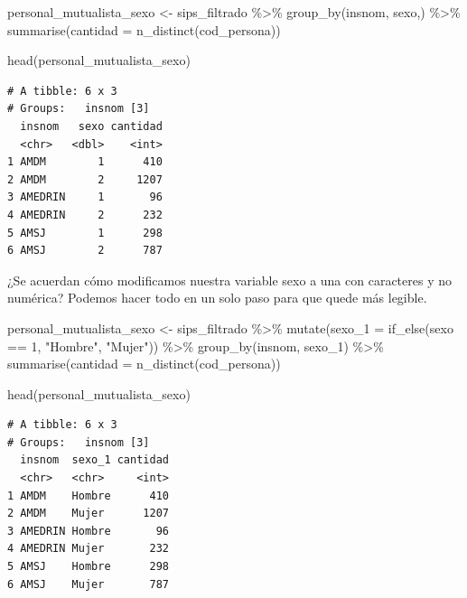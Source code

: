 \documentclass[
  letterpaper,
  DIV=11,
  numbers=noendperiod]{scrreprt}
\newenvironment{Shaded}{\begin{snugshade}}{\end{snugshade}}
\newcommand{\AttributeTok}[1]{\textcolor[rgb]{0.40,0.45,0.13}{#1}}
\newcommand{\DecValTok}[1]{\textcolor[rgb]{0.68,0.00,0.00}{#1}}
\newcommand{\FunctionTok}[1]{\textcolor[rgb]{0.28,0.35,0.67}{#1}}
\newcommand{\NormalTok}[1]{\textcolor[rgb]{0.00,0.23,0.31}{#1}}
\newcommand{\OtherTok}[1]{\textcolor[rgb]{0.00,0.23,0.31}{#1}}
\newcommand{\SpecialCharTok}[1]{\textcolor[rgb]{0.37,0.37,0.37}{#1}}
\newcommand{\StringTok}[1]{\textcolor[rgb]{0.13,0.47,0.30}{#1}}
\begin{document}
\begin{Shaded}
\begin{Highlighting}[]
\NormalTok{personal\_mutualista\_sexo }\OtherTok{\textless{}{-}}\NormalTok{ sips\_filtrado }\SpecialCharTok{\%\textgreater{}\%} 
  \FunctionTok{group\_by}\NormalTok{(insnom, sexo,) }\SpecialCharTok{\%\textgreater{}\%} 
  \FunctionTok{summarise}\NormalTok{(}\AttributeTok{cantidad =} \FunctionTok{n\_distinct}\NormalTok{(cod\_persona))}

\FunctionTok{head}\NormalTok{(personal\_mutualista\_sexo)}
\end{Highlighting}
\end{Shaded}

\begin{verbatim}
# A tibble: 6 x 3
# Groups:   insnom [3]
  insnom   sexo cantidad
  <chr>   <dbl>    <int>
1 AMDM        1      410
2 AMDM        2     1207
3 AMEDRIN     1       96
4 AMEDRIN     2      232
5 AMSJ        1      298
6 AMSJ        2      787
\end{verbatim}

¿Se acuerdan cómo modificamos nuestra variable sexo a una con caracteres
y no numérica? Podemos hacer todo en un solo paso para que quede más
legible.

\begin{Shaded}
\begin{Highlighting}[]
\NormalTok{personal\_mutualista\_sexo }\OtherTok{\textless{}{-}}\NormalTok{ sips\_filtrado }\SpecialCharTok{\%\textgreater{}\%} 
  \FunctionTok{mutate}\NormalTok{(}\AttributeTok{sexo\_1 =} \FunctionTok{if\_else}\NormalTok{(sexo }\SpecialCharTok{==} \DecValTok{1}\NormalTok{, }\StringTok{"Hombre"}\NormalTok{, }\StringTok{"Mujer"}\NormalTok{)) }\SpecialCharTok{\%\textgreater{}\%} 
  \FunctionTok{group\_by}\NormalTok{(insnom, sexo\_1) }\SpecialCharTok{\%\textgreater{}\%} 
  \FunctionTok{summarise}\NormalTok{(}\AttributeTok{cantidad =} \FunctionTok{n\_distinct}\NormalTok{(cod\_persona))}

\FunctionTok{head}\NormalTok{(personal\_mutualista\_sexo)}
\end{Highlighting}
\end{Shaded}

\begin{verbatim}
# A tibble: 6 x 3
# Groups:   insnom [3]
  insnom  sexo_1 cantidad
  <chr>   <chr>     <int>
1 AMDM    Hombre      410
2 AMDM    Mujer      1207
3 AMEDRIN Hombre       96
4 AMEDRIN Mujer       232
5 AMSJ    Hombre      298
6 AMSJ    Mujer       787
\end{verbatim}
\end{document}
